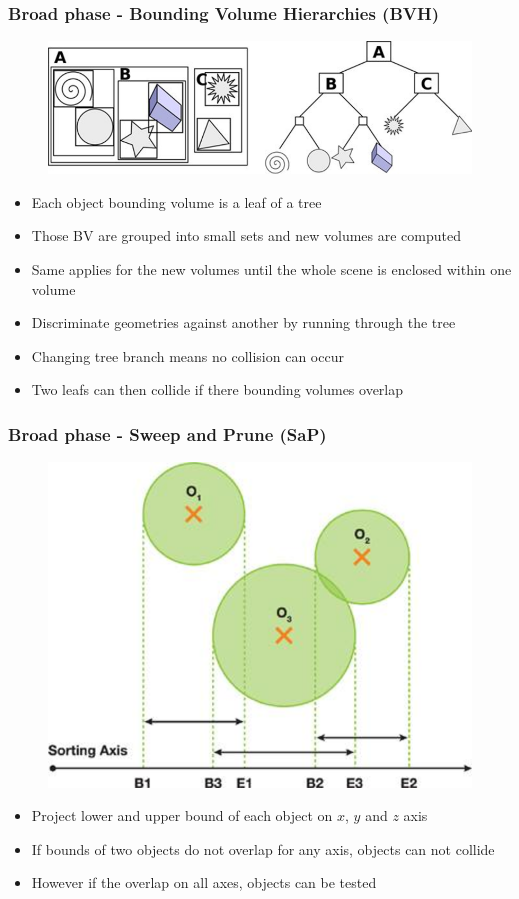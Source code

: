 \documentclass{beamer}
\begin{document}
\begin{frame}
  \frametitle{Broad phase - Bounding Volume Hierarchies (BVH)}
  
  \begin{figure}
    \centering
    \includegraphics[width=0.8\linewidth]{bvh.png}
  \end{figure}

   {
    \begin{itemize}
    \item Each object bounding volume is a leaf of a tree
    \item Those BV are grouped into small sets and new volumes are computed
    \item Same applies for the new volumes until the whole scene is enclosed within one volume
    \end{itemize}
  }

   {
    \begin{itemize}
    \item Discriminate geometries against another by running through the tree
    \item Changing tree branch means no collision can occur
    \item Two leafs can then collide if there bounding volumes overlap
    \end{itemize}
  }
  
\end{frame}

\begin{frame}
  \frametitle{Broad phase - Sweep and Prune (SaP)}

  \begin{figure}
    \centering
    \includegraphics[width=0.5\linewidth]{sap.png}
  \end{figure}

  \begin{itemize}
  \item Project lower and upper bound of each object on $x$, $y$ and $z$ axis
  \item If bounds of two objects do not overlap for any axis, objects can not collide
  \item However if the overlap on all axes, objects can be tested
  \end{itemize}

\end{frame}
\end{document}
